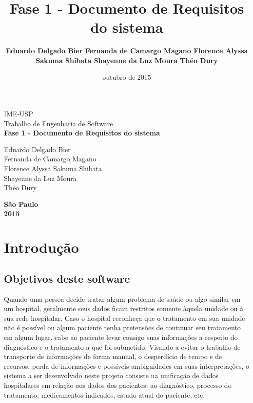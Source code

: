 \documentclass[12pt,a4paper]{report}
\author{\textbf{
 Eduardo Delgado Bier
 Fernanda de Camargo Magano 
 Florence Alyssa Sakuma Shibata 
 Shayenne da Luz Moura 
 Théo Dury }}
\title{\textbf{Fase 1 - Documento de Requisitos do sistema}}
\date{outubro de 2015}
\begin{document}
\begin{titlepage}

\begin{center}
{\large IME-USP}\\[0.2cm]
{\large Trabalho de Engenharia de Software}\\[5.1cm]
{\bf \huge Fase 1 - Documento de Requisitos do sistema}\\[5.1cm]
\end{center}


\begin{flushright}

 Eduardo Delgado Bier \\
 Fernanda de Camargo Magano \\
 Florence Alyssa Sakuma Shibata \\
 Shayenne da Luz Moura \\
 Théo Dury \\
 
\end{flushright}

\begin{center}
{\large \textbf{São Paulo}}\\[0.2cm]
{\large \textbf{2015}} \\[0.2cm]
\end{center}

\end{titlepage}

\tableofcontents

\newpage

\section{Introdução}

\subsection{Objetivos deste software}

Quando uma pessoa decide tratar algum problema de saúde ou algo similar em um hospital, geralmente seus dados ficam restritos somente àquela unidade ou à sua rede hospitalar. Caso o hospital reconheça que o tratamento em sua unidade não é possível ou algum paciente tenha pretensões de continuar seu tratamento em algum lugar, cabe ao paciente levar consigo suas informações a respeito do diagnóstico e o tratamento a que foi submetido.
Visando a evitar o trabalho de transporte de informações de forma manual, o desperdício de tempo e de recursos, perda de informações e possíveis ambiguidades em suas interpretações, o sistema a ser desenvolvido neste projeto consiste na unificação de dados hospitalares em relação aos dados dos pacientes: ao diagnóstico, processo do tratamento, medicamentos indicados, estado atual do paciente, etc.
\end{document}

